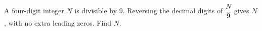 A four-digit integer $N$ is divisible by $9$. Reversing the decimal digits of $\dfrac{N}{9}$ gives $N$, with no extra leading zeros. Find $N$.
